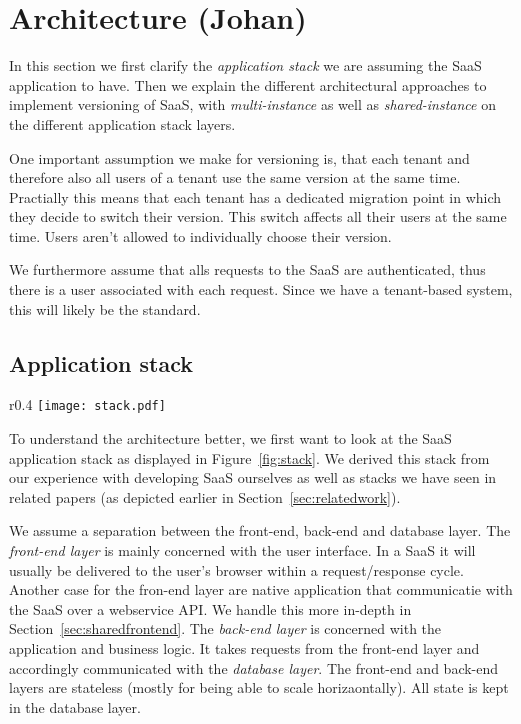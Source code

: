 \section{Architecture (Johan)}
\label{sec:architecture}

In this section we first clarify the \emph{application stack} we are assuming the SaaS application to have. Then we explain the different architectural approaches to implement versioning of SaaS, with \emph{multi-instance} as well as \emph{shared-instance} on the different application stack layers.

One important assumption we make for versioning is, that each tenant and therefore also all users of a tenant use the same version at the same time. Practially this means that each tenant has a dedicated migration point in which they decide to switch their version. This switch affects all their users at the same time. Users aren't allowed to individually choose their version.

We furthermore assume that alls requests to the SaaS are authenticated, thus there is a user associated with each request. Since we have a tenant-based system, this will likely be the standard.

\subsection{Application stack}
\label{sec:stack}

\begin{wrapfigure}{r}{0.4\textwidth}
\centering
\texttt{[image: stack.pdf]}
\caption{Simplified Application Stack}
\label{fig:stack}
\end{wrapfigure}

To understand the architecture better, we first want to look at the SaaS application stack as displayed in Figure~\ref{fig:stack}. We derived this stack from our experience with developing SaaS ourselves as well as stacks we have seen in related papers (as depicted earlier in Section~\ref{sec:relatedwork}).

We assume a separation between the front-end, back-end and database layer. The \emph{front-end layer} is mainly concerned with the user interface. In a SaaS it will usually be delivered to the user's browser within a request/response cycle. Another case for the fron-end layer are native application that communicatie with the SaaS over a webservice API. We handle this more in-depth in Section~\ref{sec:sharedfrontend}. The \emph{back-end layer} is concerned with the application and business logic. It takes requests from the front-end layer and accordingly communicated with the \emph{database layer}. The front-end and back-end layers are stateless (mostly for being able to scale horizaontally). All state is kept in the database layer.

